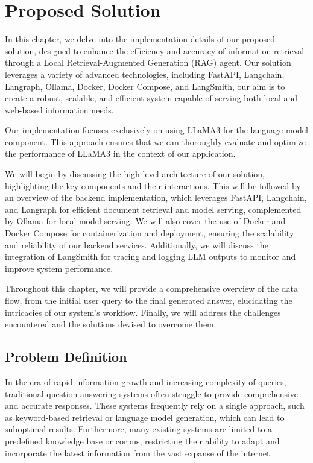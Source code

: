 \chapter{Proposed Solution}

\graphicspath{{contribution/figures/}}

In this chapter, we delve into the implementation details of our proposed solution, designed to enhance the efficiency and accuracy of information retrieval through a Local Retrieval-Augmented Generation (RAG) agent. Our solution leverages a variety of advanced technologies, including FastAPI, Langchain, Langraph, Ollama, Docker, Docker Compose, and LangSmith, our aim is to create a robust, scalable, and efficient system capable of serving both local and web-based information needs.

Our implementation focuses exclusively on using LLaMA3 for the language model component. This approach ensures that we can thoroughly evaluate and optimize the performance of LLaMA3 in the context of our application.

We will begin by discussing the high-level architecture of our solution, highlighting the key components and their interactions. This will be followed by an overview of the backend implementation, which leverages FastAPI, Langchain, and Langraph for efficient document retrieval and model serving, complemented by Ollama for local model serving. We will also cover the use of Docker and Docker Compose for containerization and deployment, ensuring the scalability and reliability of our backend services. Additionally, we will discuss the integration of LangSmith for tracing and logging LLM outputs to monitor and improve system performance.

Throughout this chapter, we will provide a comprehensive overview of the data flow, from the initial user query to the final generated answer, elucidating the intricacies of our system's workflow. Finally, we will address the challenges encountered and the solutions devised to overcome them.

\section{Problem Definition}

In the era of rapid information growth and increasing complexity of queries, traditional question-answering systems often struggle to provide comprehensive and accurate responses. These systems frequently rely on a single approach, such as keyword-based retrieval or language model generation, which can lead to suboptimal results. Furthermore, many existing systems are limited to a predefined knowledge base or corpus, restricting their ability to adapt and incorporate the latest information from the vast expanse of the internet.

